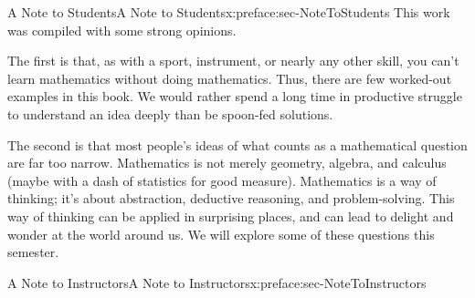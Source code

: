 \documentclass[oneside,10pt,]{book}
\numberwithin{equation}{section}
\begin{document}
\begin{preface}{A Note to Students}{}{A Note to Students}{}{}{x:preface:sec-NoteToStudents}
This work was compiled with some strong opinions.%
\par
The first is that, as with a sport, instrument, or nearly any other skill, you can't learn mathematics without doing mathematics. Thus, there are few worked-out examples in this book. We would rather spend a long time in productive struggle to understand an idea deeply than be spoon-fed solutions.%
\par
The second is that most people's ideas of what counts as a mathematical question are far too narrow. Mathematics is not merely geometry, algebra, and calculus (maybe with a dash of statistics for good measure). Mathematics is a way of thinking; it's about abstraction, deductive reasoning, and problem-solving. This way of thinking can be applied in surprising places, and can lead to delight and wonder at the world around us. We will explore some of these questions this semester.%
\end{preface}
%
%
\typeout{************************************************}
\typeout{************************************************}
%
\begin{preface}{A Note to Instructors}{}{A Note to Instructors}{}{}{x:preface:sec-NoteToInstructors}
%
\end{preface}
\setcounter{tocdepth}{0}
\renewcommand*\contentsname{Contents}
\tableofcontents
\mainmatter
%
%
\typeout{************************************************}
\typeout{************************************************}
%
\end{document}
